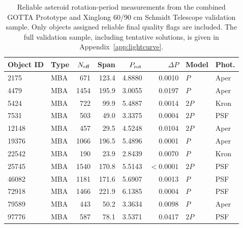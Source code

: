 \begin{table}[!htbp]
\centering
\caption{Reliable asteroid rotation-period measurements from the combined GOTTA Prototype and Xinglong 60/90 cm Schmidt Telescope validation sample. Only objects assigned reliable final quality flags are included. The full validation sample, including tentative solutions, is given in Appendix~\ref{app:lightcurve}.}
\label{tab:period_reliable_main}
\footnotesize
\setlength{\tabcolsep}{5pt}
\renewcommand{\arraystretch}{1.12}
\begin{tabular}{llrrrrll}
\toprule
Object ID & Type & $N_{\rm eff}$ & Span & $P_{\rm rot}$ & $\Delta P$ & Model & Phot. \\
\midrule
2175 & MBA & 671 & 123.4 & 4.8880 & 0.0010 & $P$ & Aper \\
4479 & MBA & 1454 & 195.9 & 3.0055 & 0.0197 & $P$ & Aper \\
5424 & MBA & 722 & 99.9 & 5.4887 & 0.0014 & $2P$ & Kron \\
7531 & MBA & 503 & 49.0 & 3.3375 & 0.0004 & $2P$ & PSF \\
12148 & MBA & 457 & 29.5 & 4.5248 & 0.0104 & $2P$ & Aper \\
19376 & MBA & 1066 & 196.5 & 5.4896 & 0.0001 & $P$ & Aper \\
22542 & MBA & 190 & 23.9 & 2.8439 & 0.0070 & $P$ & Kron \\
25745 & MBA & 1540 & 170.8 & 5.5143 & $<0.0001$ & $2P$ & PSF \\
46082 & MBA & 1181 & 171.6 & 5.6907 & 0.0013 & $P$ & PSF \\
72918 & MBA & 1466 & 221.9 & 6.1385 & 0.0004 & $P$ & PSF \\
79589 & MBA & 443 & 50.2 & 3.3634 & 0.0098 & $P$ & Aper \\
97776 & MBA & 587 & 78.1 & 3.5371 & 0.0417 & $2P$ & PSF \\
\bottomrule
\end{tabular}
\end{table}
